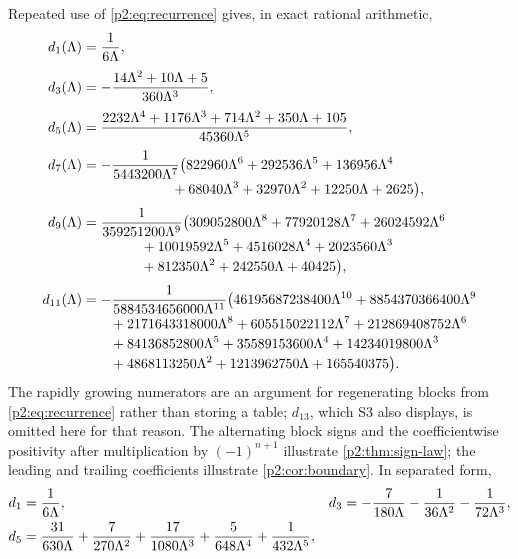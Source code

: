 \documentclass[11pt,a4paper,oneside]{book}
\theoremstyle{plain}
\theoremstyle{definition}
\theoremstyle{remark}
\begin{document}
Repeated use of \cref{p2:eq:recurrence} gives, in exact rational arithmetic,
\begin{align}
 d_1(\Lambda)&=\frac1{6\Lambda},
 \label{p2:eq:d1}\\[0.3em]
 d_3(\Lambda)&=-\frac{14\Lambda^2+10\Lambda+5}{360\Lambda^3},
 \label{p2:eq:d3}\\[0.3em]
 d_5(\Lambda)&=\frac{2232\Lambda^4+1176\Lambda^3+714\Lambda^2
   +350\Lambda+105}{45360\Lambda^5},
 \label{p2:eq:d5}\\[0.3em]
 d_7(\Lambda)&=-\frac1{5443200\Lambda^7}
  \bigl(822960\Lambda^6+292536\Lambda^5+136956\Lambda^4
  \notag\\[-0.2em]
  &\hspace{6.4em}{}+68040\Lambda^3+32970\Lambda^2+12250\Lambda+2625\bigr),
 \label{p2:eq:d7}\\[0.3em]
 d_9(\Lambda)&=\frac1{359251200\Lambda^9}
  \bigl(309052800\Lambda^8+77920128\Lambda^7+26024592\Lambda^6
  \notag\\[-0.2em]
  &\hspace{4.2em}{}+10019592\Lambda^5+4516028\Lambda^4+2023560\Lambda^3
  \notag\\[-0.2em]
  &\hspace{4.2em}{}+812350\Lambda^2+242550\Lambda+40425\bigr),
 \label{p2:eq:d9}\\[0.3em]
 d_{11}(\Lambda)&=-\frac1{5884534656000\Lambda^{11}}
  \bigl(46195687238400\Lambda^{10}+8854370366400\Lambda^9
  \notag\\[-0.2em]
  &\hspace{2.0em}{}+2171643318000\Lambda^8+605515022112\Lambda^7
  +212869408752\Lambda^6
  \notag\\[-0.2em]
  &\hspace{2.0em}{}+84136852800\Lambda^5+35589153600\Lambda^4
  +14234019800\Lambda^3
  \notag\\[-0.2em]
  &\hspace{2.0em}{}+4868113250\Lambda^2+1213962750\Lambda+165540375\bigr).
 \label{p2:eq:d11}
\end{align}
The rapidly growing numerators are an argument for regenerating blocks from
\cref{p2:eq:recurrence} rather than storing a table; \(d_{13}\), which
\textsf{S3} also displays, is omitted here for that reason.  The alternating
block signs and the coefficientwise positivity after multiplication by
\((-1)^{n+1}\) illustrate \cref{p2:thm:sign-law}; the leading and trailing
coefficients illustrate \cref{p2:cor:boundary}.  In separated form,
\begin{align}
 d_1&=\frac1{6\Lambda},
 &d_3&=-\frac7{180\Lambda}-\frac1{36\Lambda^2}-\frac1{72\Lambda^3},
 \notag\\
 d_5&=\frac{31}{630\Lambda}+\frac7{270\Lambda^2}+\frac{17}{1080\Lambda^3}
      +\frac5{648\Lambda^4}+\frac1{432\Lambda^5},
 &&
 \label{p2:eq:d-separated}
\end{align}
\end{document}
